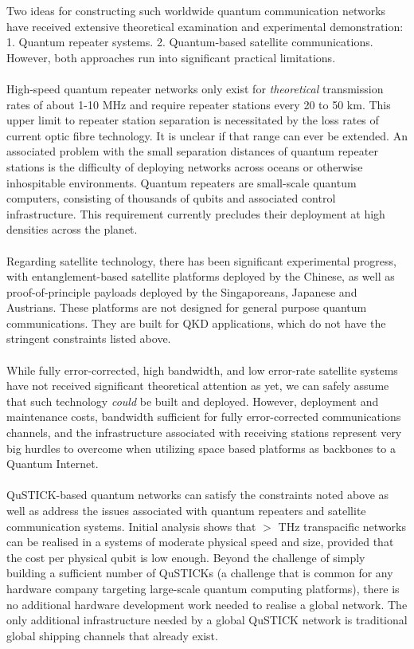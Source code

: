 \documentclass[aps,prl,twocolumn,10pt,nofootinbib]{revtex4}
\begin{document}
Two ideas for constructing such worldwide quantum communication networks have received extensive theoretical examination and experimental demonstration: 1. Quantum repeater systems. 2. Quantum-based satellite communications.  However, both approaches run into significant practical limitations.
\\
\\
High-speed quantum repeater networks only exist for {\em theoretical} transmission rates of about 1-10 MHz and require repeater stations every 20 to 50 km.  This upper limit to repeater station separation is necessitated by the loss rates of current optic fibre technology.  It is unclear if that range can ever be extended.  An associated problem with the small separation distances of quantum repeater stations is the difficulty of deploying networks across oceans or otherwise inhospitable environments.  Quantum repeaters are small-scale quantum computers, consisting of thousands of qubits and associated control infrastructure.  This requirement currently precludes their deployment at high densities across the planet.  
\\
\\
Regarding satellite technology, there has been significant experimental progress, with entanglement-based satellite platforms deployed by the Chinese, as well as proof-of-principle payloads deployed by the Singaporeans, Japanese and Austrians.  These platforms are not designed for general purpose quantum communications.  They are built for QKD applications, which do not have the stringent constraints listed above. 
\\
\\
While fully error-corrected, high bandwidth, and low error-rate satellite systems have not received significant theoretical attention as yet, we can safely assume that such technology {\em could} be built and deployed.  However, deployment and maintenance costs, bandwidth sufficient for fully error-corrected communications channels, and the infrastructure associated with receiving stations represent very big hurdles to overcome when utilizing space based platforms as backbones to a Quantum Internet.  
\\
\\
QuSTICK-based quantum networks can satisfy the constraints noted above as well as address the issues associated with quantum repeaters and satellite communication systems.  Initial analysis shows that $>$ THz transpacific networks can be realised in a systems of moderate physical speed and size, provided that the cost per physical qubit is low enough.  Beyond the challenge of simply building a sufficient number of QuSTICKs (a challenge that is common for any hardware company targeting large-scale quantum computing platforms), there is no additional hardware development work needed to realise a global network.  The only additional infrastructure needed by a global QuSTICK network is traditional global shipping channels that already exist.  
\end{document}
